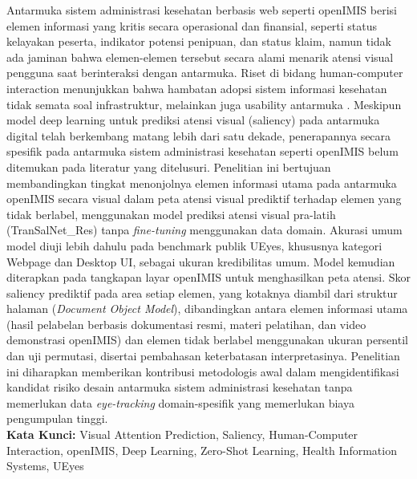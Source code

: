\documentclass[proposal,indonesia]{ugmskripsi}
\begin{document}
\cover
\titlepageind
\approvalpage

\tableofcontents

\abstractind

Antarmuka sistem administrasi kesehatan berbasis web seperti openIMIS berisi elemen informasi yang kritis secara operasional dan finansial, seperti status kelayakan peserta, indikator potensi penipuan, dan status klaim, namun tidak ada jaminan bahwa elemen-elemen tersebut secara alami menarik atensi visual pengguna saat berinteraksi dengan antarmuka. Riset di bidang human-computer interaction menunjukkan bahwa hambatan adopsi sistem informasi kesehatan tidak semata soal infrastruktur, melainkan juga usability antarmuka \citep{verma2021openmrs,paton2022open}. Meskipun model deep learning untuk prediksi atensi visual (saliency) pada antarmuka digital telah berkembang matang lebih dari satu dekade, penerapannya secara spesifik pada antarmuka sistem administrasi kesehatan seperti openIMIS belum ditemukan pada literatur yang ditelusuri. Penelitian ini bertujuan membandingkan tingkat menonjolnya elemen informasi utama pada antarmuka openIMIS secara visual dalam peta atensi visual prediktif terhadap elemen yang tidak berlabel, menggunakan model prediksi atensi visual pra-latih (TranSalNet\_Res) tanpa \textit{fine-tuning} menggunakan data domain. Akurasi umum model diuji lebih dahulu pada benchmark publik UEyes, khususnya kategori Webpage dan Desktop UI, sebagai ukuran kredibilitas umum. Model kemudian diterapkan pada tangkapan layar openIMIS untuk menghasilkan peta atensi. Skor saliency prediktif pada area setiap elemen, yang kotaknya diambil dari struktur halaman (\textit{Document Object Model}), dibandingkan antara elemen informasi utama (hasil pelabelan berbasis dokumentasi resmi, materi pelatihan, dan video demonstrasi openIMIS) dan elemen tidak berlabel menggunakan ukuran persentil dan uji permutasi, disertai pembahasan keterbatasan interpretasinya. Penelitian ini diharapkan memberikan kontribusi metodologis awal dalam mengidentifikasi kandidat risiko desain antarmuka sistem administrasi kesehatan tanpa memerlukan data \textit{eye-tracking} domain-spesifik yang memerlukan biaya pengumpulan tinggi.
\\

\noindent \textbf{Kata Kunci:} 
\newline 
Visual Attention Prediction, Saliency, Human-Computer Interaction, openIMIS, Deep Learning, Zero-Shot Learning, Health Information Systems, UEyes
\endabstractind
\end{document}
